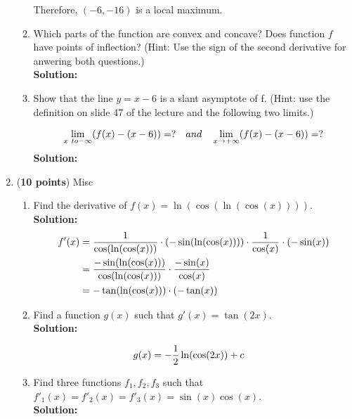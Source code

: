 \documentclass[a4paper]{article}
\begin{document}
\begin{enumerate}
\begin{enumerate}
Therefore, $(-6,-16)$ is a local maximum.\\


	
	
	\item Which parts of the function are convex and concave? Does function $f$ have points of inflection? (Hint: Use the sign of the second derivative for anwering both questions.)\\
	\textbf{Solution:}\\	
	
	\item Show that the line $y = x - 6$ is a slant asymptote of f. (Hint: use the definition on slide 47 of the lecture and the following two limits.)
	
	\begin{align}
		\lim_{x \ to -\infty}(f(x) - (x-6)) = ? \quad and \quad \lim_{x \to +\infty}(f(x) - (x-6)) = ?\notag
	\end{align}		
\textbf{Solution:}\\	
	
	
\end{enumerate}


\item (\textbf{10 points}) Misc

\begin{enumerate}
	\item Find the derivative of $f(x) = \ln(\cos(\ln(\cos(x)))).$\\
	\textbf{Solution:}\\
	
	
\begin{align}
	f'(x) &= \frac{1}{\cos(\ln(\cos(x)))} \cdot (-\sin(\ln(\cos(x)))) \cdot \frac{1}{\cos(x)} \cdot (-\sin(x))\notag\\
	&= \frac{-\sin(\ln(\cos(x)))}{\cos(\ln(\cos(x)))} \cdot \frac{-\sin(x)}{\cos(x)}\notag\\
	&= -\tan(\ln(\cos(x))) \cdot (-\tan(x))\notag
\end{align}	
	
	
	
	\item Find a function $g(x)$ such that $g'(x) = \tan(2x).$\\
	\textbf{Solution:}
	
\begin{align*}
	g(x) &= -\frac{1}{2}\ln(\cos(2x)) + c\notag
\end{align*}	
\vspace{1em}		
	
	
	\item Find three functions $f_1, f_2, f_3$ such that $f'_1(x) = f'_2(x) = f'_3(x) = \sin(x)\cos(x)$.\\
	\textbf{Solution:}\\
		
	
\end{enumerate}




\end{enumerate}
\end{document}
